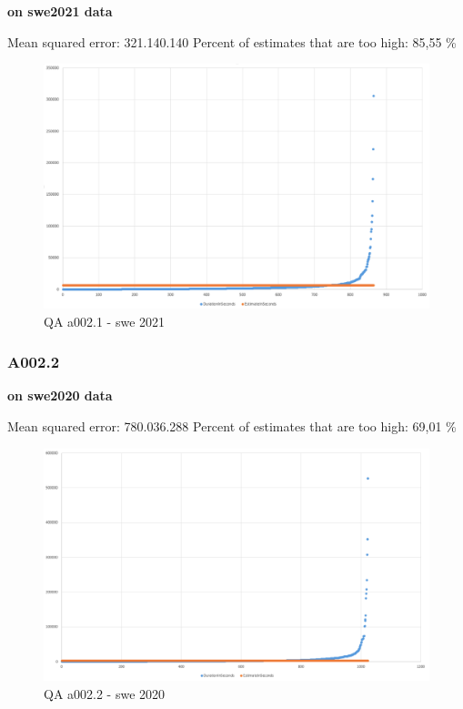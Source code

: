 \textbf{on swe2021 data}

Mean squared error: 321.140.140 Percent of estimates that are too high:
85,55 \%

\begin{figure}
\centering
\includegraphics[width=\textwidth]{Documentation/10000-A002/a002_1-swe2021.png}
\caption{QA a002.1 - swe 2021}
\end{figure}

\hypertarget{a002.2-1}{%
\subsubsection{A002.2}\label{a002.2-1}}

\textbf{on swe2020 data}

Mean squared error: 780.036.288 Percent of estimates that are too high:
69,01 \%

\begin{figure}
\centering
\includegraphics[width=\textwidth]{Documentation/10000-A002/a002_2-swe2020.png}
\caption{QA a002.2 - swe 2020}
\end{figure}

